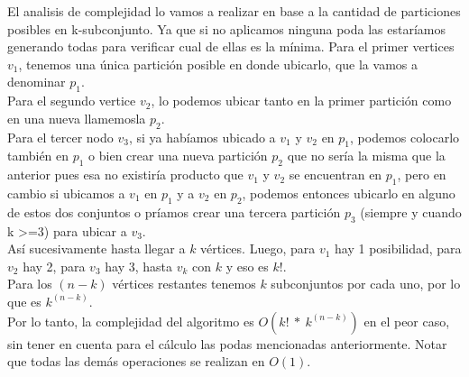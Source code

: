 El analisis de complejidad lo vamos a realizar en base a la cantidad de particiones posibles en k-subconjunto. Ya que si no aplicamos ninguna poda las estaríamos generando todas para verificar cual de ellas es la mínima.
Para el primer vertices $v_1$, tenemos una única partición posible en donde ubicarlo, que la vamos a denominar $p_1$.\\
Para el segundo vertice $v_2$, lo podemos ubicar tanto en la primer partición como en una nueva llamemosla $p_2$.\\
Para el tercer nodo $v_3$, si ya habíamos ubicado a $v_1$ y $v_2$ en $p_1$, podemos colocarlo tambi\'en en $p_1$ o bien crear una nueva partición $p_2$ que no sería la misma que la anterior pues esa no existiría producto que $v_1$ y $v_2$ se encuentran en $p_1$, pero en cambio si ubicamos a $v_1$ en $p_1$ y a $v_2$ en $p_2$, podemos entonces ubicarlo en alguno de estos dos conjuntos o príamos crear una tercera partición $p_3$ (siempre y cuando k >=3) para ubicar a $v_3$.\\

Así sucesivamente hasta llegar a $k$ vértices. Luego, para $v_1$ hay 1 posibilidad, para $v_2$ hay 2, para $v_3$ hay 3, hasta $v_k$ con $k$ y eso es $k!$.\\

Para los $(n-k)$ v\'ertices restantes tenemos $k$ subconjuntos por cada uno, por lo que es $k^{(n-k)}$.\\

Por lo tanto, la complejidad del algoritmo es $O(k!\ *\ k^{(n-k)})$ en el peor caso, sin tener en cuenta para el c\'alculo las podas mencionadas anteriormente. Notar que todas las dem\'as operaciones se realizan en $O(1)$.